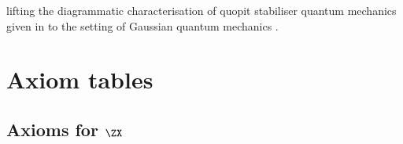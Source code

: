 lifting the diagrammatic characterisation of quopit stabiliser quantum
mechanics given in \cite{poor_qupit_2023} to the setting of Gaussian quantum
mechanics \cite{weedbrook_gaussian_2012}.
\appendix\section{Axiom tables}\label{app:axioms}
%
%
\subsection{Axioms for \texorpdfstring{\(\ZX\)}{GSA}}
\label{ssec:zx-axioms}
